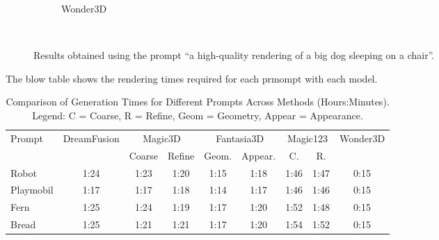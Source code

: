 \begin{figure}[ht]
\begin{subfigure}[b]{0.27\textwidth}
        \caption{Wonder3D}
        \vspace{0.1cm}
    \end{subfigure}
    \caption{Results obtained using the prompt ``a high-quality rendering of a big dog sleeping on a chair''.}~\label{fig:resultDogBack}
\end{figure}


The blow table shows the rendering times required for each prmompt with each model. 

\begin{table}[ht]
    \centering
    \small 
    \begin{tabular}{lcccccccc}
    \toprule
    Prompt & DreamFusion & \multicolumn{2}{c}{Magic3D} & \multicolumn{2}{c}{Fantasia3D} & \multicolumn{2}{c}{Magic123} & Wonder3D \\
    \cmidrule(r){3-4} \cmidrule(lr){5-6} \cmidrule(l){7-8}
    & & \multicolumn{1}{c}{Coarse} & \multicolumn{1}{c}{Refine} & \multicolumn{1}{c}{Geom.} & \multicolumn{1}{c}{Appear.} & \multicolumn{1}{c}{C.} & \multicolumn{1}{c}{R.} &  \\
    \midrule
    Robot & 1:24 & 1:23 & 1:20 & 1:15 & 1:18 & 1:46 & 1:47 & 0:15 \\
    Playmobil & 1:17 & 1:17 & 1:18 & 1:14 & 1:17 & 1:46 & 1:46 & 0:15 \\
    Fern & 1:25 & 1:24 & 1:19 & 1:17 & 1:20 & 1:52 & 1:48 & 0:15 \\
    Bread & 1:25 & 1:21 & 1:21 & 1:17 & 1:20 & 1:54 & 1:52 & 0:15 \\
    \bottomrule
    \end{tabular}
    \caption{Comparison of Generation Times for Different Prompts Across Methods (Hours:Minutes). Legend: C = Coarse, R = Refine, Geom = Geometry, Appear = Appearance.}~\label{table:generation_times_complex}
\end{table}

    
    
    
    